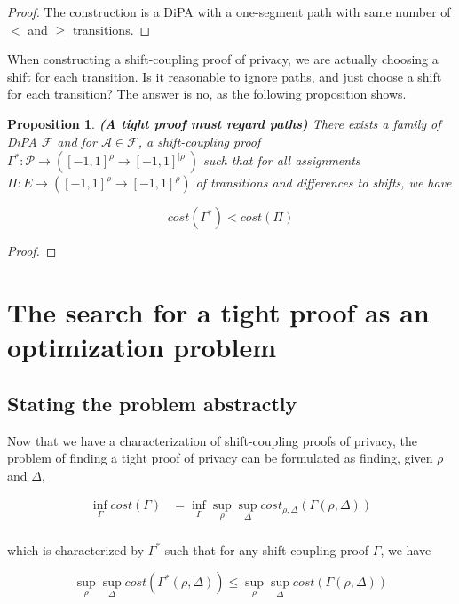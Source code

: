 \documentclass{article}
\newtheorem{proposition}{Proposition}[section]
\newcommand{\1}{\langle 1 \rangle}
\newcommand{\2}{\langle 2 \rangle}
\begin{document}
\begin{proof}
    The construction is a DiPA with a one-segment path with same number of $<$ and $\geq$ transitions.
\end{proof}

When constructing a shift-coupling proof of privacy, we are actually choosing a shift for each transition. Is it reasonable to ignore paths, and just choose a shift for each transition? The answer is no, as the following proposition shows.

\begin{proposition}
    \textbf{(A tight proof must regard paths)} There exists a family of DiPA $\mathcal{F}$ and for $\mathcal{A} \in \mathcal{F}$, a shift-coupling proof $\Gamma^*: \mathcal{P} \to ([-1, 1]^{\rho} \to [-1, 1]^{|\rho|})$ such that for all assignments $\Pi: E \to ([-1, 1]^{\rho} \to [-1, 1]^{\rho})$ of transitions and differences to shifts, we have

    \[cost(\Gamma^*) < cost(\Pi)\]
\end{proposition}

\begin{proof}
    
\end{proof}

\section{The search for a tight proof as an optimization problem}

\subsection{Stating the problem abstractly}

Now that we have a characterization of shift-coupling proofs of privacy, the problem of finding a tight proof of privacy can be formulated as finding, given $\rho$ and $\Delta$,

\begin{align*}
    \inf_{\Gamma} cost(\Gamma) &= \inf_{\Gamma} \sup_{\rho} \sup_{\Delta} cost_{\rho, \Delta}(\Gamma(\rho, \Delta)) \\
\end{align*}

which is characterized by $\Gamma^*$ such that for any shift-coupling proof $\Gamma$, we have

\[\sup_{\rho} \sup_{\Delta} cost(\Gamma^*(\rho, \Delta)) \leq \sup_{\rho} \sup_{\Delta} cost(\Gamma(\rho, \Delta))\]
\end{document}
